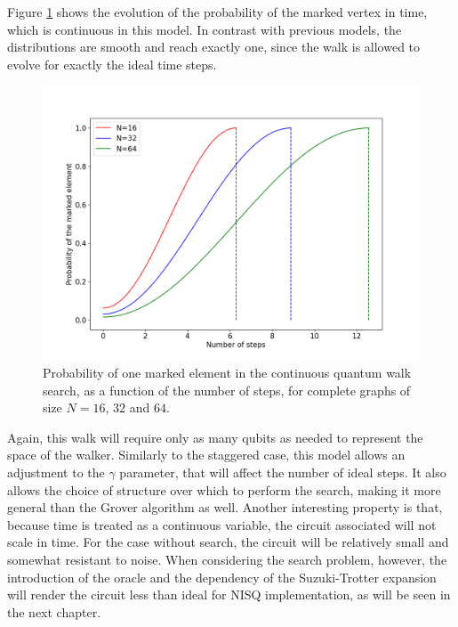 \documentclass[../../dissertation.tex]{subfiles}
\begin{document}
Figure \ref{fig:ContSearch} shows the evolution of the probability of the
marked vertex in time, which is continuous in this model. In contrast with
previous models, the distributions are smooth and reach exactly one, since the
walk is allowed to evolve for exactly the ideal time steps.
\begin{figure}[!t]
	\centering \includegraphics[scale=0.40]{img/ContQuantumWalk/Search/163264.png}
	\caption{Probability of one marked element in the continuous quantum walk search, as a function of the number of steps, for complete graphs of size $N=16$, $32$ and $64$.}\label{fig:ContSearch}
\end{figure}\par

Again, this walk will require only as many qubits as needed to represent the
space of the walker. Similarly to the staggered case, this model allows an
adjustment to the $\gamma$ parameter, that will affect the number of ideal
steps. It also allows the choice of structure over which to perform the
search, making it more general than the Grover algorithm as well. Another
interesting property is that, because time is treated as a continuous variable,
the circuit associated will not scale in time. For the case without
search, the circuit will be relatively small and somewhat resistant to noise.
When considering the search problem, however, the introduction of the oracle
and the dependency of the Suzuki-Trotter expansion will render the circuit less
than ideal for NISQ implementation, as will be seen in the next chapter.
\end{document}
